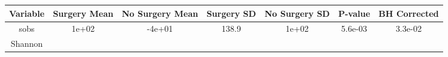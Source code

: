 \documentclass[12pt,]{article}
\begin{document}
\begin{longtable}[]{@{}ccccccc@{}}
\toprule
\begin{minipage}[b]{0.22\columnwidth}\centering\strut
Variable\strut
\end{minipage} & \begin{minipage}[b]{0.10\columnwidth}\centering\strut
Surgery Mean\strut
\end{minipage} & \begin{minipage}[b]{0.12\columnwidth}\centering\strut
No Surgery Mean\strut
\end{minipage} & \begin{minipage}[b]{0.09\columnwidth}\centering\strut
Surgery SD\strut
\end{minipage} & \begin{minipage}[b]{0.11\columnwidth}\centering\strut
No Surgery SD\strut
\end{minipage} & \begin{minipage}[b]{0.07\columnwidth}\centering\strut
P-value\strut
\end{minipage} & \begin{minipage}[b]{0.10\columnwidth}\centering\strut
BH Corrected\strut
\end{minipage}\tabularnewline
\midrule
\endhead
\begin{minipage}[t]{0.22\columnwidth}\centering\strut
sobs\strut
\end{minipage} & \begin{minipage}[t]{0.10\columnwidth}\centering\strut
1e+02\strut
\end{minipage} & \begin{minipage}[t]{0.12\columnwidth}\centering\strut
-4e+01\strut
\end{minipage} & \begin{minipage}[t]{0.09\columnwidth}\centering\strut
138.9\strut
\end{minipage} & \begin{minipage}[t]{0.11\columnwidth}\centering\strut
1e+02\strut
\end{minipage} & \begin{minipage}[t]{0.07\columnwidth}\centering\strut
5.6e-03\strut
\end{minipage} & \begin{minipage}[t]{0.10\columnwidth}\centering\strut
3.3e-02\strut
\end{minipage}\tabularnewline
\begin{minipage}[t]{0.22\columnwidth}\centering\strut
Shannon\strut
\end{minipage} & \begin{minipage}[t]{0.10\columnwidth}\centering\strut

\end{minipage}
\end{longtable}
\end{document}
